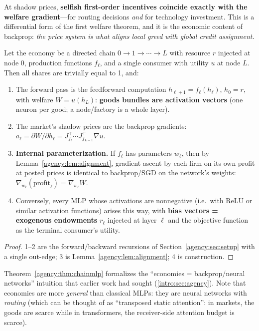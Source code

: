 At shadow prices, \textbf{selfish first-order incentives coincide exactly with the welfare
gradient}---for routing decisions \emph{and} for technology investment. This is a
differential form of the first welfare theorem, and it is the economic content of backprop:
\emph{the price system is what aligns local greed with global credit assignment.}

\begin{theorem}[chain = MLP]\label{agency:thm:chainmlp}
Let the economy be a directed chain $0 \to 1 \to \cdots \to L$ with resource $r$ injected at
node $0$, production functions $f_\ell$, and a single consumer with utility $u$ at node $L$.
Then all shares are trivially equal to 1, and:
\begin{enumerate}
  \item The forward pass is the feedforward computation $h_{\ell+1} = f_\ell(h_\ell)$,
  $h_0 = r$, with welfare $W = u(h_L)$: \textbf{goods bundles are activation vectors} (one
  neuron per good; a node/factory is a whole layer).
  \item The market's shadow prices are the backprop gradients:
  $a_\ell = \partial W / \partial h_\ell = J_{f_\ell}^\top \cdots J_{f_{L-1}}^\top \nabla u$.
  \item \textbf{Internal parameterization.} If $f_\ell$ has parameters $w_\ell$, then by
  Lemma~\ref{agency:lem:alignment}, gradient ascent by each firm on its own profit at posted
  prices is identical to backprop/SGD on the network's weights:
  $\nabla_{w_\ell}(\text{profit}_\ell) = \nabla_{w_\ell} W$.
  \item Conversely, every MLP whose activations are nonnegative (i.e.\ with ReLU or similar
  activation functions) arises this way, with \textbf{bias vectors = exogenous endowments}
  $r_\ell$ injected at layer $\ell$ and the objective function as the terminal consumer's
  utility.
\end{enumerate}
\end{theorem}

\begin{proof}
1--2 are the forward/backward recursions of Section~\ref{agency:sec:setup} with a single
out-edge; 3 is Lemma~\ref{agency:lem:alignment}; 4 is construction.
\end{proof}

Theorem~\ref{agency:thm:chainmlp} formalizes the ``economies = backprop/neural
networks'' intuition that earlier work had sought (\cref{intro:sec:agency}). Note that economies are more
\emph{general} than classical MLPs: they are neural networks with \emph{routing} (which can be
thought of as ``transposed static attention'': in markets, the goods are scarce while in
transformers, the receiver-side attention budget is scarce).



